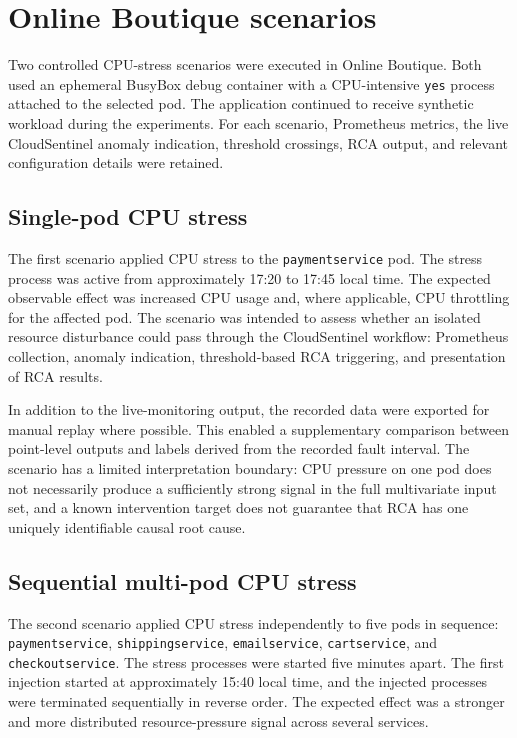 \section{Online Boutique scenarios}
Two controlled CPU-stress scenarios were executed in Online Boutique. Both used an ephemeral BusyBox debug container with a CPU-intensive \texttt{yes} process attached to the selected pod. The application continued to receive synthetic workload during the experiments. For each scenario, Prometheus metrics, the live CloudSentinel anomaly indication, threshold crossings, RCA output, and relevant configuration details were retained.

\subsection{Single-pod CPU stress}
The first scenario applied CPU stress to the \texttt{paymentservice} pod. The stress process was active from approximately 17:20 to 17:45 local time. The expected observable effect was increased CPU usage and, where applicable, CPU throttling for the affected pod. The scenario was intended to assess whether an isolated resource disturbance could pass through the CloudSentinel workflow: Prometheus collection, anomaly indication, threshold-based RCA triggering, and presentation of RCA results.

In addition to the live-monitoring output, the recorded data were exported for manual replay where possible. This enabled a supplementary comparison between point-level outputs and labels derived from the recorded fault interval. The scenario has a limited interpretation boundary: CPU pressure on one pod does not necessarily produce a sufficiently strong signal in the full multivariate input set, and a known intervention target does not guarantee that RCA has one uniquely identifiable causal root cause.

\subsection{Sequential multi-pod CPU stress}
The second scenario applied CPU stress independently to five pods in sequence: \texttt{paymentservice}, \texttt{shippingservice}, \texttt{emailservice}, \texttt{cartservice}, and \texttt{checkoutservice}. The stress processes were started five minutes apart. The first injection started at approximately 15:40 local time, and the injected processes were terminated sequentially in reverse order. The expected effect was a stronger and more distributed resource-pressure signal across several services.

